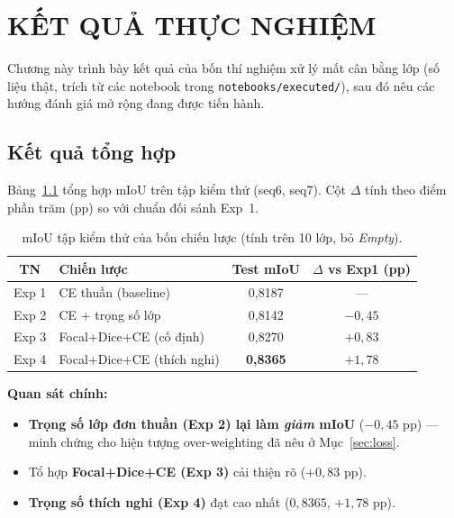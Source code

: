 \chapter{KẾT QUẢ THỰC NGHIỆM}
\label{ch:ket_qua}

Chương này trình bày kết quả của bốn thí nghiệm xử lý mất cân bằng lớp (số liệu
thật, trích từ các notebook trong \texttt{notebooks/executed/}), sau đó nêu các hướng
đánh giá mở rộng đang được tiến hành.

\section{Kết quả tổng hợp}
\label{sec:ket_qua_tong_hop}

Bảng~\ref{tab:miou} tổng hợp mIoU trên tập kiểm thử (seq6, seq7). Cột $\Delta$ tính
theo điểm phần trăm (pp) so với chuẩn đối sánh Exp~1.

\begin{table}[H]
\centering
\caption{mIoU tập kiểm thử của bốn chiến lược (tính trên 10 lớp, bỏ \textit{Empty}).}
\label{tab:miou}
\begin{tabular}{c l c c}
\toprule
\textbf{TN} & \textbf{Chiến lược} & \textbf{Test mIoU} & \textbf{$\Delta$ vs Exp1 (pp)} \\
\midrule
Exp 1 & CE thuần (baseline)               & 0{,}8187 & --- \\
Exp 2 & CE + trọng số lớp                 & 0{,}8142 & $-0{,}45$ \\
Exp 3 & Focal+Dice+CE (cố định)           & 0{,}8270 & $+0{,}83$ \\
Exp 4 & Focal+Dice+CE (thích nghi)        & \textbf{0{,}8365} & \textbf{$+1{,}78$} \\
\bottomrule
\end{tabular}
\end{table}

\noindent\textbf{Quan sát chính:}
\begin{itemize}[leftmargin=1.4cm]
  \item \textbf{Trọng số lớp đơn thuần (Exp 2) lại làm \emph{giảm} mIoU}
  ($-0{,}45$ pp) --- minh chứng cho hiện tượng over-weighting đã nêu ở
  Mục~\ref{sec:loss}.
  \item Tổ hợp \textbf{Focal+Dice+CE (Exp 3)} cải thiện rõ ($+0{,}83$ pp).
  \item \textbf{Trọng số thích nghi (Exp 4)} đạt cao nhất ($0{,}8365$, $+1{,}78$ pp).
\end{itemize}

